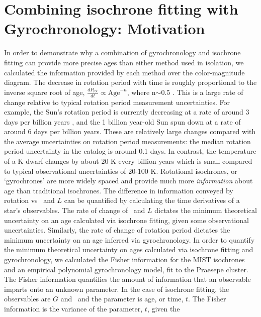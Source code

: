 \section{Combining isochrone fitting with Gyrochronology: Motivation}
\label{section:motivation}

In order to demonstrate why a combination of gyrochronology and isochrone
fitting can provide more precise ages than either method used in isolation, we
calculated the information provided by each method over the color-magnitude
diagram.
The decrease in rotation period with time is roughly proportional to the
inverse square root of age, $\frac{dP_{\mathrm{rot}}}{dt} \propto
\mathrm{Age}^{-n}$, where n$\sim$0.5 \citep{skumanich1972}.
This is a large rate of change relative to typical rotation period measurement
uncertainties.
For example, the Sun's rotation period is currently decreasing at a rate of
around 3 days per billion years \citep[unless it has already stopped spinning
down][]{vansaders2016}, and the 1 billion year-old Sun spun down at a rate of
around 6 days per billion years.
These are relatively large changes compared with the average uncertainties on
rotation period measurements: the median rotation period uncertainty in the
\citet{mcquillan2014} catalog is around 0.1 days.
In contrast, the temperature of a K dwarf changes by about 20 K every billion
years which is small compared to typical observational uncertainties of 20-100
K.
Rotational isochrones, or `gyrochrones' are more widely spaced and provide
much more {\it information} about age than traditional isochrones.
The difference in information conveyed by rotation vs \teff\ and $L$ can be
quantified by calculating the time derivatives of a star's observables.
The rate of change of \teff\ and $L$ dictates the minimum theoretical
uncertainty on an age calculated via isochrone fitting, given some
observational uncertainties.
Similarly, the rate of change of rotation period dictates the minimum
uncertainty on an age inferred via gyrochronology.
In order to quantify the minimum theoretical uncertainty on ages calculated
via isochrone fitting and gyrochronology, we calculated the Fisher information
for the MIST isochrones \citep{paxton2011, paxton2013, paxton2015, dotter2016,
choi2016, paxton2018} and an empirical polynomial gyrochronology model, fit to
the Praesepe cluster.
The Fisher information quantifies the amount of information that an observable
imparts onto an unknown parameter.
In the case of isochrone fitting, the observables are $G$ and \gcolor\ and the
parameter is age, or time, $t$.
The Fisher information is the variance of the parameter, $t$, given the
